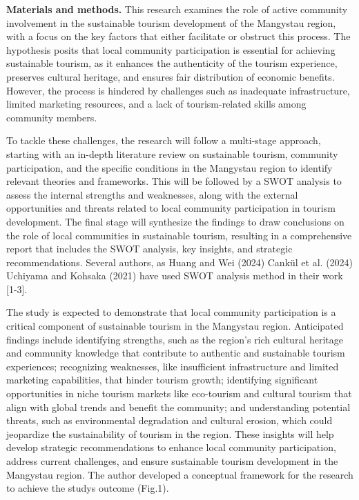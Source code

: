 {\bfseries Materials and methods.} This research examines the role of
active community involvement in the sustainable tourism development of
the Mangystau region, with a focus on the key factors that either
facilitate or obstruct this process. The hypothesis posits that local
community participation is essential for achieving sustainable tourism,
as it enhances the authenticity of the tourism experience, preserves
cultural heritage, and ensures fair distribution of economic benefits.
However, the process is hindered by challenges such as inadequate
infrastructure, limited marketing resources, and a lack of
tourism-related skills among community members.

To tackle these challenges, the research will follow a multi-stage
approach, starting with an in-depth literature review on sustainable
tourism, community participation, and the specific conditions in the
Mangystau region to identify relevant theories and frameworks. This will
be followed by a SWOT analysis to assess the internal strengths and
weaknesses, along with the external opportunities and threats related to
local community participation in tourism development. The final stage
will synthesize the findings to draw conclusions on the role of local
communities in sustainable tourism, resulting in a comprehensive report
that includes the SWOT analysis, key insights, and strategic
recommendations. Several authors, as Huang and Wei (2024) Cankül et al.
(2024) Uchiyama and Kohsaka (2021) have used SWOT analysis method in
their work {[}1-3{]}.

The study is expected to demonstrate that local community participation
is a critical component of sustainable tourism in the Mangystau region.
Anticipated findings include identifying strengths, such as the region's
rich cultural heritage and community knowledge that contribute to
authentic and sustainable tourism experiences; recognizing weaknesses,
like insufficient infrastructure and limited marketing capabilities,
that hinder tourism growth; identifying significant opportunities in
niche tourism markets like eco-tourism and cultural tourism that align
with global trends and benefit the community; and understanding
potential threats, such as environmental degradation and cultural
erosion, which could jeopardize the sustainability of tourism in the
region. These insights will help develop strategic recommendations to
enhance local community participation, address current challenges, and
ensure sustainable tourism development in the Mangystau region. The
author developed a conceptual framework for the research to achieve the
study\textquotesingle s outcome (Fig.1).

